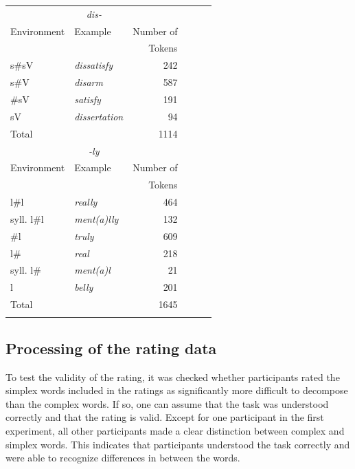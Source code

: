 \begin{table}
{\begin{tabular} {llrllr}
			\midrule
			\multicolumn{3}{c}{\textit{dis-}} \\\cmidrule(lr){1-3}
			Environment & Example & Number of & & & \\
			&  & Tokens & & & \\
			\midrule
			s\#sV&\textit{dissatisfy} & 242 & & & \\ 
			s\#V&\textit{disarm} & 587& & & \\ 
			\#sV&\textit{satisfy} & 191& & & \\ 
			sV&\textit{dissertation} & 94 & & & \\ 
			Total&  & 1114& & & \\ 
			\midrule
			\multicolumn{3}{c}{\textit{-ly}} \\\cmidrule(lr){1-3}
			Environment & Example & Number of & & & \\
						 &  & Tokens & & & \\
			\midrule
			l\#l &\textit{really} & 464 & & & \\ 
			syll. l\#l &\textit{ment(a)lly} & 132 & & & \\ 
			\#l &\textit{truly} & 609& & & \\ 
			l\# &\textit{real} & 218& & & \\ 
			syll. l\#&\textit{ment(a)l} &21& & &\\ 
			l &\textit{belly} & 201& & & \\ 
			Total&  &1645 & & & \\ 

			\lspbottomrule
		\end{tabular}
	}
	
\end{table}



\subsection{Processing of the rating data} \label{Processing of the Rating Data}


To test the validity of the rating, it was checked whether participants rated the simplex words included in the ratings as significantly more difficult to decompose than the complex words. If so, one can assume that the task was understood correctly and that the rating is valid. 
Except for one participant in the first experiment, all other participants made a clear distinction between complex and simplex words. This indicates that participants understood the task correctly and were able to recognize differences in  between the words.

